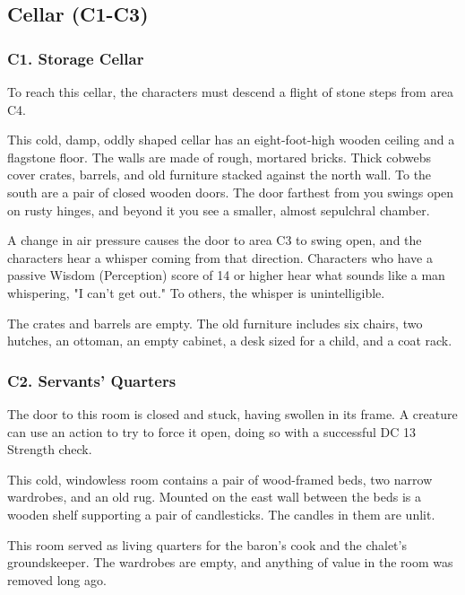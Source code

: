 \documentclass[10pt,a4paper,twoside,bg=print,twocolumn,openany,nodeprecatedcode]{dndbook}
\begin{document}
\subsection{Cellar (C1-C3)}
\subsubsection{C1. Storage Cellar}
To reach this cellar, the characters must descend a flight of stone steps from area C4.

\begin{DndReadAloud}{}
This cold, damp, oddly shaped cellar has an eight-foot-high wooden ceiling and a flagstone floor. The walls are made of rough, mortared bricks. Thick cobwebs cover crates, barrels, and old furniture stacked against the north wall. To the south are a pair of closed wooden doors. The door farthest from you swings open on rusty hinges, and beyond it you see a smaller, almost sepulchral chamber. 

\end{DndReadAloud}

A change in air pressure causes the door to area C3 to swing open, and the characters hear a whisper coming from that direction. Characters who have a passive Wisdom (Perception) score of 14 or higher hear what sounds like a man whispering, "I can't get out." To others, the whisper is unintelligible.

The crates and barrels are empty. The old furniture includes six chairs, two hutches, an ottoman, an empty cabinet, a desk sized for a child, and a coat rack.

\subsubsection{C2. Servants' Quarters}
The door to this room is closed and stuck, having swollen in its frame. A creature can use an action to try to force it open, doing so with a successful DC 13 Strength check.

\begin{DndReadAloud}{}
This cold, windowless room contains a pair of wood-framed beds, two narrow wardrobes, and an old rug. Mounted on the east wall between the beds is a wooden shelf supporting a pair of candlesticks. The candles in them are unlit. 

\end{DndReadAloud}

This room served as living quarters for the baron's cook and the chalet's groundskeeper. The wardrobes are empty, and anything of value in the room was removed long ago.
\end{document}
